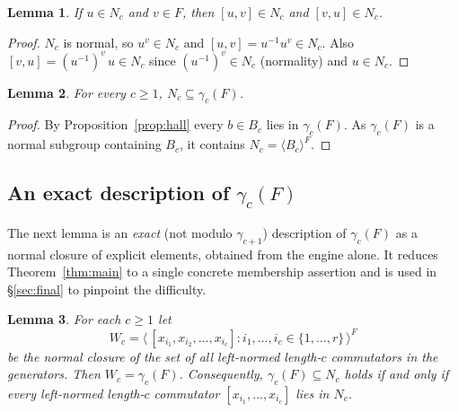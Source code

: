\documentclass{amsart}
\newtheorem{lemma}{Lemma}
\theoremstyle{definition}
\theoremstyle{remark}
\begin{document}
\begin{lemma}\label{lem:caseA}
If $u\in N_c$ and $v\in F$, then $[u,v]\in N_c$ and $[v,u]\in N_c$.
\end{lemma}

\begin{proof}
$N_c$ is normal, so $u^{v}\in N_c$ and $[u,v]=u^{-1}u^{v}\in N_c$. Also
$[v,u]=(u^{-1})^{v}\,u\in N_c$ since $(u^{-1})^{v}\in N_c$ (normality) and
$u\in N_c$.
\end{proof}

\begin{lemma}\label{lem:easy}
For every $c\ge1$, $N_c\subseteq\gamma_c(F)$.
\end{lemma}

\begin{proof}
By Proposition~\ref{prop:hall} every $b\in B_c$ lies in $\gamma_c(F)$. As
$\gamma_c(F)$ is a normal subgroup containing $B_c$, it contains
$N_c=\langle B_c\rangle^{F}$.
\end{proof}

\subsection*{An exact description of $\gamma_c(F)$}

The next lemma is an \emph{exact} (not modulo $\gamma_{c+1}$) description of
$\gamma_c(F)$ as a normal closure of explicit elements, obtained from the engine
alone. It reduces Theorem~\ref{thm:main} to a single concrete membership
assertion and is used in \S\ref{sec:final} to pinpoint the difficulty.

\begin{lemma}\label{lem:Wc}
For each $c\ge 1$ let
\[
W_c=\big\langle\,[x_{i_1},x_{i_2},\dots,x_{i_c}] : i_1,\dots,i_c\in\{1,\dots,r\}\,\big\rangle^{F}
\]
be the normal closure of the set of all left-normed length-$c$ commutators in the
generators. Then $W_c=\gamma_c(F)$. Consequently, $\gamma_c(F)\subseteq N_c$ holds
if and only if every left-normed length-$c$ commutator $[x_{i_1},\dots,x_{i_c}]$
lies in $N_c$.
\end{lemma}
\end{document}

